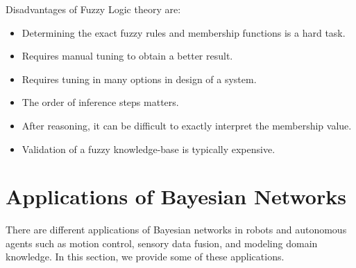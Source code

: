 \documentclass[11pt]{article}
\begin{document}
\noindent Disadvantages of Fuzzy Logic theory are:

\begin{itemize}
  \item Determining the exact fuzzy rules and membership functions is a hard
  task.
  \item Requires manual tuning to obtain a better result.
  \item Requires tuning in many options in design of a system.
  \item The order of inference steps matters.
  \item After reasoning, it can be difficult to exactly interpret the membership
  value.
  \item Validation of a fuzzy knowledge-base is typically expensive.
\end{itemize}

\section{Applications of Bayesian Networks}
\label{sec:applications}

There are different applications of Bayesian networks in robots and autonomous
agents such as motion control, sensory data fusion, and modeling domain
knowledge. In this section, we provide some of these applications.
\end{document}
